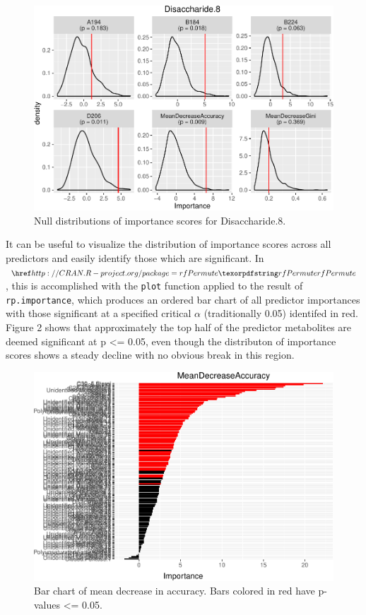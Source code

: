 \begin{Schunk}
\begin{figure}
\includegraphics{archer_files/figure-latex/plotNull-1} \caption[Null distributions of importance scores for Disaccharide.8]{Null distributions of importance scores for Disaccharide.8.}\label{fig:plotNull}
\end{figure}
\end{Schunk}

It can be useful to visualize the distribution of importance scores
across all predictors and easily identify those which are significant.
In \(\CRANpkg{rfPermute}\), this is accomplished with the \texttt{plot}
function applied to the result of \texttt{rp.importance}, which produces
an ordered bar chart of all predictor importances with those significant
at a specified critical \(\alpha\) (traditionally 0.05) identifed in
red. Figure 2 shows that approximately the top half of the predictor
metabolites are deemed significant at p \textless{}= 0.05, even though
the distributon of importance scores shows a steady decline with no
obvious break in this region.

\begin{Schunk}
\begin{figure}
\includegraphics{archer_files/figure-latex/plot_imp1-1} \caption[Bar chart of mean decrease in accuracy]{Bar chart of mean decrease in accuracy. Bars colored in red have p-values <= 0.05.}\label{fig:plot_imp1}
\end{figure}
\end{Schunk}

